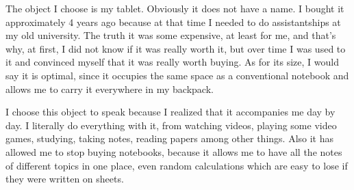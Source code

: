 \documentclass[12pt]{article}
\begin{document}
The object I choose is my tablet. Obviously it does not have a name. I bought it approximately 4 years ago because at that time I needed to do assistantships at my old university. The truth it was some expensive, at least for me, and that's why, at first, I did not know if it was really worth it, but over time I was used to it and convinced myself that it was really worth buying. As for its size, I would say it is optimal, since it occupies the same space as a conventional notebook and allows me to carry it everywhere in my backpack.

I choose this object to speak because I realized that it accompanies me day by day. I literally do everything with it, from watching videos, playing some video games, studying, taking notes, reading papers among other things. Also it has allowed me to stop buying notebooks, because it allows me to have all the notes of different topics in one place, even random calculations which are easy to lose if they were written on sheets.
\end{document}
